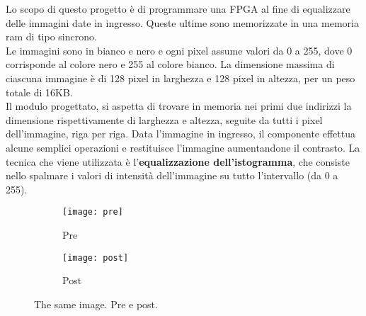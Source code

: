 Lo scopo di questo progetto è di programmare una FPGA al fine di equalizzare delle immagini date in ingresso. Queste ultime sono memorizzate in una memoria ram di tipo sincrono.\\
Le immagini sono in bianco e nero e ogni pixel assume valori da 0 a 255, dove 0 corrisponde al colore nero e 255 al colore bianco. La dimensione massima di ciascuna immagine è di 128 pixel in larghezza e 128 pixel in altezza, per un peso totale di 16KB.\\
Il modulo progettato, si aspetta di trovare in memoria nei primi due indirizzi la dimensione rispettivamente di larghezza e altezza, seguite da tutti i pixel dell'immagine, riga per riga. Data l'immagine in ingresso, il componente effettua alcune semplici operazioni e restituisce l'immagine aumentandone il contrasto. La tecnica che viene utilizzata è l'\textbf{equalizzazione dell'istogramma}, che consiste nello spalmare i valori di intensità dell'immagine su tutto l'intervallo  (da 0 a 255).\\

\begin{figure}[h!]
  \centering
  \begin{subfigure}[b]{0.4\linewidth}
    \texttt{[image: pre]}
    \caption{Pre}
  \end{subfigure}
  \begin{subfigure}[b]{0.4\linewidth}
    \texttt{[image: post]}
    \caption{Post}
  \end{subfigure}
  \caption{The same image. Pre e post.}
  \label{fig:coffee}
\end{figure}
